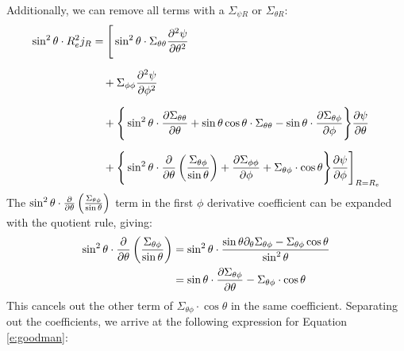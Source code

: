 \documentclass{article}
\begin{document}
Additionally, we can remove all terms with a $\Sigma_{\psi R}$ or $\Sigma_{\theta R}$:
\begin{equation*}
	\begin{aligned}
		\sin^2\theta \cdot R_e^2j_R
		 & =  \Bigg[
			\sin^2 \theta \cdot  \Sigma_{\theta\theta}
		\pdv[2]{\psi}{\theta}                                                     \\[6pt]
		 & \quad + \Sigma_{\phi\phi}
		\pdv[2]{\psi}{\phi}                                                       \\[6pt]
		 & \quad + \Bigg\{
		\sin^2\theta\cdot \pdv{\Sigma_{\theta\theta}}{\theta}
		+ \sin \theta\cos\theta\cdot \Sigma_{\theta\theta}
		- \sin\theta\cdot\pdv{\Sigma_{\theta\phi}}{\phi}\Bigg\}\pdv{\psi}{\theta} \\[6pt]
		 & \quad + \Bigg\{\sin^2\theta\cdot\pdv{\theta}
		\left( \frac{\Sigma_{\theta\phi}}{\sin\theta} \right) +
		\pdv{\Sigma_{\phi\phi}}{\phi}
		+ \Sigma_{\theta\phi}\cdot\cos\theta
		\Bigg\}\pdv{\psi}{\phi}
		\Bigg]_{R = R_e}
	\end{aligned}
\end{equation*}
The $\sin^2 \theta \cdot \pdv\theta \left(\frac{\Sigma_{\theta\phi}}{\sin\theta}\right)$
term in the first $\phi$ derivative coefficient can be expanded with the quotient rule, giving:
\begin{equation*}
	\begin{aligned}
		\sin^2 \theta \cdot \pdv\theta \left(\frac{\Sigma_{\theta\phi}}{\sin\theta}\right)
		 & =
		\sin^2\theta \cdot\frac{\sin\theta\partial_\theta\Sigma_{\theta\phi} - \Sigma_{\theta\phi}\cos\theta}{\sin^2\theta} \\
		 & = \sin\theta\cdot\pdv{\Sigma_{\theta\phi}}{\theta} - \Sigma_{\theta\phi}\cdot \cos\theta                         \\
	\end{aligned}
\end{equation*}
This cancels out the other term of $\Sigma_{\theta\phi}\cdot \cos\theta$ in the same coefficient. Separating out the coefficients, we arrive at the following expression for Equation \ref{e:goodman}:
\end{document}
